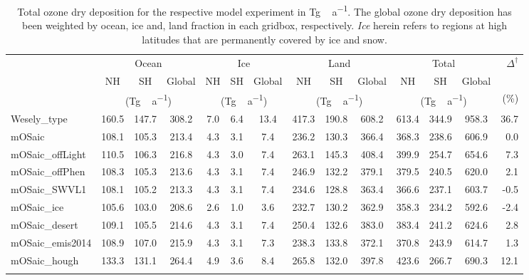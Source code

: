 \documentclass[gmd, manuscript]{copernicus}
\begin{document}
\begin{table}[t]
  \caption{Total ozone dry deposition for the respective model experiment in \unit{Tg\,a^{-1}}. The global ozone dry deposition has been weighted by ocean, ice and, land fraction in each gridbox, respectively. \emph{Ice} herein refers to regions at high latitudes that are permanently covered by ice and snow.}
  \begin{tabular}{lccccccccc|cccr}
    \tophline
    \multirow{3}{*}{Experiment} & \multicolumn{3}{c}{Ocean} & \multicolumn{3}{c}{Ice} & \multicolumn{3}{c}{Land} & \multicolumn{3}{c}{Total} & $\Delta^\dagger$\\
    & NH & SH & Global & NH & SH & Global & NH & SH & Global & NH & SH & Global\\
    & \multicolumn{3}{c}{(\unit{Tg\,a^{-1}})} & \multicolumn{3}{c}{(\unit{Tg\,a^{-1}})} & \multicolumn{3}{c}{(\unit{Tg\,a^{-1}})} & \multicolumn{3}{c}{(\unit{Tg\,a^{-1}})} & (\unit{\%})\\
    \middlehline
    Wesely\_type & 160.5 & 147.7 & 308.2 & 7.0 & 6.4 & 13.4 & 417.3 & 190.8 & 608.2 & 613.4 & 344.9 & 958.3 & 36.7\\
    mOSaic & 108.1 & 105.3 & 213.4 & 4.3 & 3.1 & 7.4 & 236.2 & 130.3 & 366.4 & 368.3 & 238.6 & 606.9 & 0.0\\
    mOSaic\_offLight & 110.5 & 106.3 & 216.8 & 4.3 & 3.0 & 7.4 & 263.1 & 145.3 & 408.4 & 399.9 & 254.7 & 654.6 & 7.3\\
    mOSaic\_offPhen & 108.3 & 105.3 & 213.6 & 4.3 & 3.1 & 7.4 & 246.9 & 132.2 & 379.1 & 379.5 & 240.5 & 620.0 & 2.1\\
    mOSaic\_SWVL1 & 108.1 & 105.2 & 213.3 & 4.3 & 3.1 & 7.4 & 234.6 & 128.8 & 363.4 & 366.6 & 237.1 & 603.7 & -0.5\\
    mOSaic\_ice & 105.6 & 103.0 & 208.6 & 2.6 & 1.0 & 3.6 & 232.7 & 130.2 & 362.9 & 358.3 & 234.2 & 592.6 & -2.4\\
    mOSaic\_desert & 109.1 & 105.5 & 214.6 & 4.3 & 3.1 & 7.4 & 250.4 & 132.6 & 383.0 & 383.4 & 241.2 & 624.6 & 2.8\\
    mOSaic\_emis2014 & 108.9 & 107.0 & 215.9 & 4.3 & 3.1 & 7.3 & 238.3 & 133.8 & 372.1 & 370.8 & 243.9 & 614.7 & 1.3\\
    mOSaic\_hough & 133.3 & 131.1 & 264.4 & 4.9 & 3.6 & 8.4 & 265.8 & 132.0 & 397.8 & 423.6 & 266.7 & 690.3 & 12.1\\
    \bottomhline
  \end{tabular}
  \label{tab:ozone_sinks}
\end{table}
\end{document}
